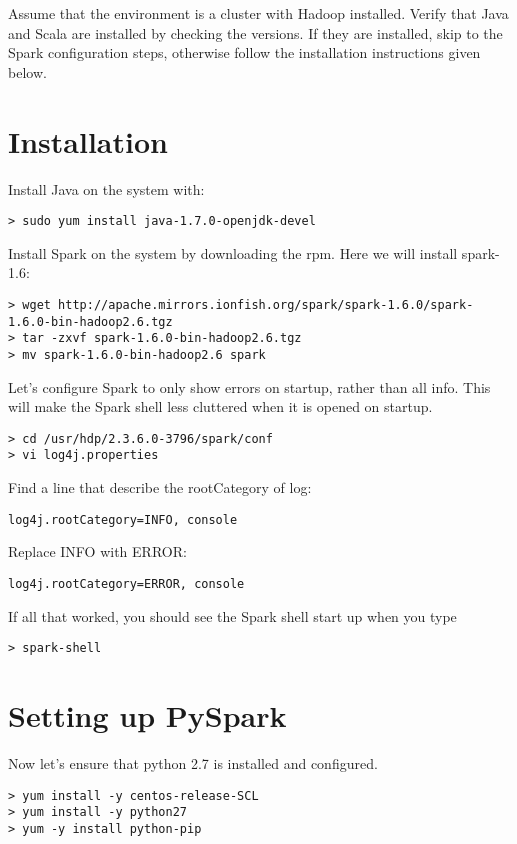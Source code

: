 \documentclass[9pt,twocolumn,twoside]{idsi}
\begin{document}
Assume that the environment is a cluster with Hadoop installed. Verify that Java and Scala are installed by checking the versions. If they are installed, skip to the Spark configuration steps, otherwise follow the installation instructions given below.

\section{Installation}

\noindent
Install Java on the system with:
\begin{verbatim}
> sudo yum install java-1.7.0-openjdk-devel
\end{verbatim}

\noindent
Install Spark on the system by downloading the rpm. Here we will install spark-1.6:
\begin{lstlisting}[breaklines]
> wget http://apache.mirrors.ionfish.org/spark/spark-1.6.0/spark-1.6.0-bin-hadoop2.6.tgz
> tar -zxvf spark-1.6.0-bin-hadoop2.6.tgz
> mv spark-1.6.0-bin-hadoop2.6 spark
\end{lstlisting}

\noindent
Let's configure Spark to only show errors on startup, rather than all info. This will make the Spark shell less cluttered when it is opened on startup.
\begin{verbatim}
> cd /usr/hdp/2.3.6.0-3796/spark/conf
> vi log4j.properties
\end{verbatim}

\noindent
Find a line that describe the rootCategory of log:
\begin{verbatim}
log4j.rootCategory=INFO, console
\end{verbatim}

Replace INFO with ERROR:
\begin{verbatim}
log4j.rootCategory=ERROR, console
\end{verbatim}

If all that worked, you should see the Spark shell start up when you type
\begin{verbatim}
> spark-shell
\end{verbatim}

\section{Setting up PySpark}

Now let's ensure that python 2.7 is installed and configured.
\begin{verbatim}
> yum install -y centos-release-SCL
> yum install -y python27
> yum -y install python-pip
\end{verbatim}
\end{document}
